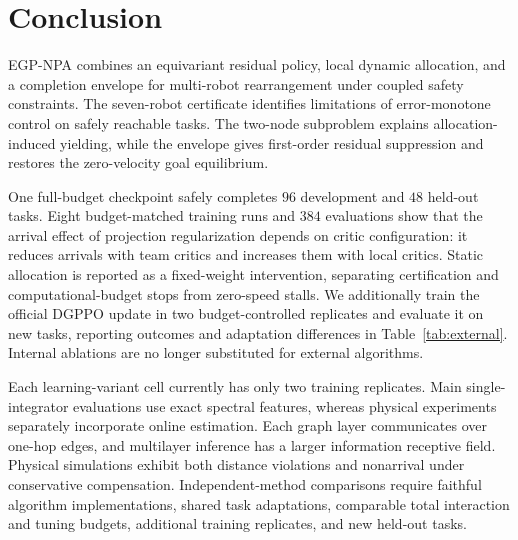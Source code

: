 \section{Conclusion}\label{sec:conclusion}
EGP-NPA combines an equivariant residual policy, local dynamic allocation, and a completion envelope for multi-robot rearrangement under coupled safety constraints. The seven-robot certificate identifies limitations of error-monotone control on safely reachable tasks. The two-node subproblem explains allocation-induced yielding, while the envelope gives first-order residual suppression and restores the zero-velocity goal equilibrium.

One full-budget checkpoint safely completes $96$ development and $48$ held-out tasks. Eight budget-matched training runs and $384$ evaluations show that the arrival effect of projection regularization depends on critic configuration: it reduces arrivals with team critics and increases them with local critics. Static allocation is reported as a fixed-weight intervention, separating certification and computational-budget stops from zero-speed stalls. We additionally train the official DGPPO update in two budget-controlled replicates and evaluate it on new tasks, reporting outcomes and adaptation differences in Table~\ref{tab:external}. Internal ablations are no longer substituted for external algorithms.

Each learning-variant cell currently has only two training replicates. Main single-integrator evaluations use exact spectral features, whereas physical experiments separately incorporate online estimation. Each graph layer communicates over one-hop edges, and multilayer inference has a larger information receptive field. Physical simulations exhibit both distance violations and nonarrival under conservative compensation. Independent-method comparisons require faithful algorithm implementations, shared task adaptations, comparable total interaction and tuning budgets, additional training replicates, and new held-out tasks.
